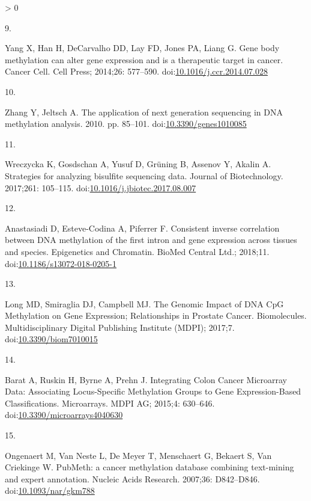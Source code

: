 \documentclass[10pt,letterpaper]{article}
\newlength{\csllabelwidth}
\newlength{\cslhangindent}
\newenvironment{CSLReferences}[3] %
 {%
  \setlength{\parindent}{0pt}
  \ifodd #1 \everypar{\setlength{\hangindent}{\cslhangindent}}\ignorespaces\fi
  \ifnum #2 > 0
  \setlength{\parskip}{#2\baselineskip}
  \fi
 }%
 {}
\newcommand{\CSLLeftMargin}[1]{\parbox[t]{\csllabelwidth}{#1}}
\newcommand{\CSLRightInline}[1]{\parbox[t]{\linewidth - \csllabelwidth}{#1}}
\begin{document}
\begin{CSLReferences}{0}{0}
\leavevmode\hypertarget{ref-Yang2014}{}%
\CSLLeftMargin{9. }
\CSLRightInline{Yang X, Han H, DeCarvalho DD, Lay FD, Jones PA, Liang G.
{Gene body methylation can alter gene expression and is a therapeutic
target in cancer}. Cancer Cell. Cell Press; 2014;26: 577--590.
doi:\href{https://doi.org/10.1016/j.ccr.2014.07.028}{10.1016/j.ccr.2014.07.028}}

\leavevmode\hypertarget{ref-Zhang2010}{}%
\CSLLeftMargin{10. }
\CSLRightInline{Zhang Y, Jeltsch A. {The application of next generation
sequencing in DNA methylation analysis}. 2010. pp. 85--101.
doi:\href{https://doi.org/10.3390/genes1010085}{10.3390/genes1010085}}

\leavevmode\hypertarget{ref-Wreczycka2017}{}%
\CSLLeftMargin{11. }
\CSLRightInline{Wreczycka K, Gosdschan A, Yusuf D, Grüning B, Assenov Y,
Akalin A. {Strategies for analyzing bisulfite sequencing data}. Journal
of Biotechnology. 2017;261: 105--115.
doi:\href{https://doi.org/10.1016/j.jbiotec.2017.08.007}{10.1016/j.jbiotec.2017.08.007}}

\leavevmode\hypertarget{ref-Anastasiadi2018}{}%
\CSLLeftMargin{12. }
\CSLRightInline{Anastasiadi D, Esteve-Codina A, Piferrer F. {Consistent
inverse correlation between DNA methylation of the first intron and gene
expression across tissues and species}. Epigenetics and Chromatin.
BioMed Central Ltd.; 2018;11.
doi:\href{https://doi.org/10.1186/s13072-018-0205-1}{10.1186/s13072-018-0205-1}}

\leavevmode\hypertarget{ref-Long2017}{}%
\CSLLeftMargin{13. }
\CSLRightInline{Long MD, Smiraglia DJ, Campbell MJ. {The Genomic Impact
of DNA CpG Methylation on Gene Expression; Relationships in Prostate
Cancer.} Biomolecules. Multidisciplinary Digital Publishing Institute
(MDPI); 2017;7.
doi:\href{https://doi.org/10.3390/biom7010015}{10.3390/biom7010015}}

\leavevmode\hypertarget{ref-Barat2015}{}%
\CSLLeftMargin{14. }
\CSLRightInline{Barat A, Ruskin H, Byrne A, Prehn J. {Integrating Colon
Cancer Microarray Data: Associating Locus-Specific Methylation Groups to
Gene Expression-Based Classifications}. Microarrays. MDPI AG; 2015;4:
630--646.
doi:\href{https://doi.org/10.3390/microarrays4040630}{10.3390/microarrays4040630}}

\leavevmode\hypertarget{ref-Ongenaert2007}{}%
\CSLLeftMargin{15. }
\CSLRightInline{Ongenaert M, Van Neste L, De Meyer T, Menschaert G,
Bekaert S, Van Criekinge W. {PubMeth: a cancer methylation database
combining text-mining and expert annotation}. Nucleic Acids Research.
2007;36: D842--D846.
doi:\href{https://doi.org/10.1093/nar/gkm788}{10.1093/nar/gkm788}}

\end{CSLReferences}

\nolinenumbers
\end{document}
